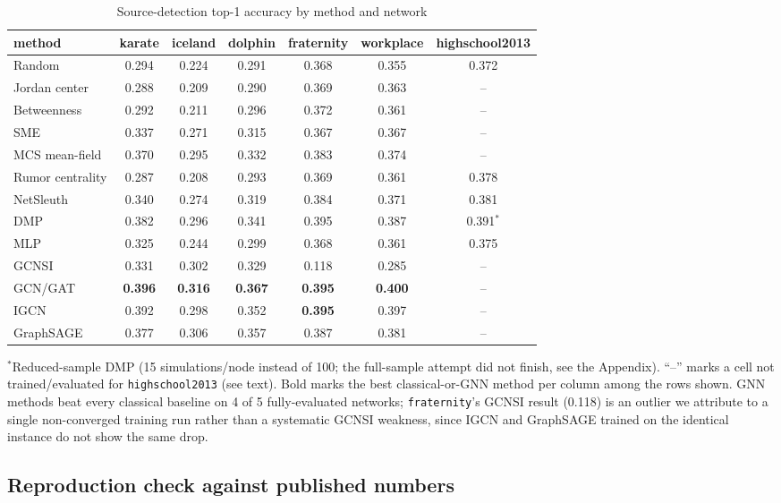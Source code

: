 \documentclass[ASNA,number]{USG}
\newcommand{\up}{\rule{0pt}{2.6ex}}
\newcommand{\down}{\rule[-1.2ex]{0pt}{0pt}}
\begin{document}
\begin{table}[h]
\centering
\caption{Source-detection top-1 accuracy by method and network\label{tab:source-detection}}
\begin{tabular}{@{}lcccccc@{}}
\hline
\up method & karate & iceland & dolphin & fraternity & workplace & highschool2013 \\
\hline
\up Random & 0.294 & 0.224 & 0.291 & 0.368 & 0.355 & 0.372 \\
Jordan center & 0.288 & 0.209 & 0.290 & 0.369 & 0.363 & -- \\
Betweenness & 0.292 & 0.211 & 0.296 & 0.372 & 0.361 & -- \\
SME & 0.337 & 0.271 & 0.315 & 0.367 & 0.367 & -- \\
MCS mean-field & 0.370 & 0.295 & 0.332 & 0.383 & 0.374 & -- \\
Rumor centrality & 0.287 & 0.208 & 0.293 & 0.369 & 0.361 & 0.378 \\
NetSleuth & 0.340 & 0.274 & 0.319 & 0.384 & 0.371 & 0.381 \\
DMP & 0.382 & 0.296 & 0.341 & 0.395 & 0.387 & 0.391$^{*}$ \\
MLP & 0.325 & 0.244 & 0.299 & 0.368 & 0.361 & 0.375 \\
GCNSI \citep{dong2019} & 0.331 & 0.302 & 0.329 & 0.118 & 0.285 & -- \\
GCN/GAT \citep{shah2020} & \textbf{0.396} & \textbf{0.316} & \textbf{0.367} & \textbf{0.395} & \textbf{0.400} & -- \\
IGCN \citep{guo2021} & 0.392 & 0.298 & 0.352 & \textbf{0.395} & 0.397 & -- \\
\down GraphSAGE \citep{haddad2023} & 0.377 & 0.306 & 0.357 & 0.387 & 0.381 & -- \\
\hline
\end{tabular}
$^{*}$Reduced-sample DMP (15 simulations/node instead of 100; the
full-sample attempt did not finish, see the Appendix). ``--'' marks a
cell not trained/evaluated for \texttt{highschool2013} (see text). Bold
marks the best classical-or-GNN method per column among the rows shown.
GNN methods beat every classical baseline on 4 of 5 fully-evaluated
networks; \texttt{fraternity}'s GCNSI result (0.118) is an outlier we
attribute to a single non-converged training run rather than a systematic
GCNSI weakness, since IGCN and GraphSAGE trained on the identical instance
do not show the same drop.
\end{table}

\subsection{Reproduction check against published numbers}\label{ec:reproduction-check}
\end{document}
